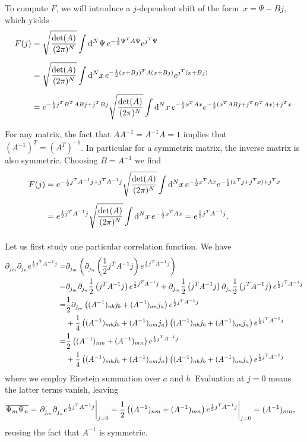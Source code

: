 To compute $F$, we will introduce a $j$-dependent shift of the form $x = \Psi - Bj$, which yields
\begin{align*}
	F(j) &= \sqrt{\frac{\det(A)}{(2\pi)^{N}}}\int\limits_{}^{}\dd[N]{\Psi}e^{-\frac{1}{2}\Psi^{T}A\Psi}e^{j^{T}\Psi} \\
	     &= \sqrt{\frac{\det(A)}{(2\pi)^{N}}}\int\limits_{}^{}\dd[N]{x}e^{-\frac{1}{2}(x + Bj)^{T}A(x + Bj)}e^{j^{T}(x + Bj)} \\
	     &= e^{-\frac{1}{2}j^{T}B^{T}ABj + j^{T}Bj}\sqrt{\frac{\det(A)}{(2\pi)^{N}}}\int\limits_{}^{}\dd[N]{x}e^{-\frac{1}{2}x^{T}Ax}e^{-\frac{1}{2}(x^{T}ABj + j^{T}B^{T}Ax) + j^{T}x}.
\end{align*}
For any matrix, the fact that $AA^{-1} = A^{-1}A = 1$ implies that $(A^{-1})^{T} = (A^{T})^{-1}$. In particular for a symmetrix matrix, the inverse matrix is also symmetric. Choosing $B = A^{-1}$ we find
\begin{align*}
	F(j) &= e^{-\frac{1}{2}j^{T}A^{-1}j + j^{T}A^{-1}j}\sqrt{\frac{\det(A)}{(2\pi)^{N}}}\int\limits_{}^{}\dd[N]{x}e^{-\frac{1}{2}x^{T}Ax}e^{-\frac{1}{2}(x^{T}j + j^{T}x) + j^{T}x} \\
	     &= e^{\frac{1}{2}j^{T}A^{-1}j}\sqrt{\frac{\det(A)}{(2\pi)^{N}}}\int\limits_{}^{}\dd[N]{x}e^{-\frac{1}{2}x^{T}Ax} = e^{\frac{1}{2}j^{T}A^{-1}j}.
\end{align*}

Let us first study one particular correlation function. We have
\begin{align*}
	\partial^{}_{j_{m}}\partial^{}_{j_{n}}e^{\frac{1}{2}j^{T}A^{-1}j} =& \partial^{}_{j_{m}}\left(\partial^{}_{j_{n}}\left(\frac{1}{2}j^{T}A^{-1}j\right)e^{\frac{1}{2}j^{T}A^{-1}j}\right) \\
	=& \partial^{}_{j_{m}}\partial^{}_{j_{n}}\frac{1}{2}\left(j^{T}A^{-1}j\right)e^{\frac{1}{2}j^{T}A^{-1}j} + \partial^{}_{j_{m}}\frac{1}{2}\left(j^{T}A^{-1}j\right)\partial^{}_{j_{n}}\frac{1}{2}\left(j^{T}A^{-1}j\right)e^{\frac{1}{2}j^{T}A^{-1}j} \\
	=& \frac{1}{2}\partial^{}_{j_{m}}\left((A^{-1})_{nb}j_{b} + (A^{-1})_{an}j_{a}\right)e^{\frac{1}{2}j^{T}A^{-1}j} \\
	 &+ \frac{1}{4}\left((A^{-1})_{mb}j_{b} + (A^{-1})_{am}j_{a}\right)\left((A^{-1})_{nb}j_{b} + (A^{-1})_{an}j_{a}\right)e^{\frac{1}{2}j^{T}A^{-1}j} \\
	=& \frac{1}{2}\left((A^{-1})_{nm} + (A^{-1})_{mn}\right)e^{\frac{1}{2}j^{T}A^{-1}j} \\
	 &+ \frac{1}{4}\left((A^{-1})_{mb}j_{b} + (A^{-1})_{am}j_{a}\right)\left((A^{-1})_{nb}j_{b} + (A^{-1})_{an}j_{a}\right)e^{\frac{1}{2}j^{T}A^{-1}j}
\end{align*}
where we employ Einstein summation over $a$ and $b$. Evaluation at $j = 0$ means the latter terms vanish, leaving
\begin{align*}
	\overline{\Psi_{m}\Psi_{n}} = \eval{\del{}{j_{m}}\del{}{j_{n}}e^{\frac{1}{2}j^{T}A^{-1}j}}_{j = 0} =& \eval{\frac{1}{2}\left((A^{-1})_{nm} + (A^{-1})_{mn}\right)e^{\frac{1}{2}j^{T}A^{-1}j}}_{j = 0} = (A^{-1})_{mn},
\end{align*}
reusing the fact that $A^{-1}$ is symmetric.

